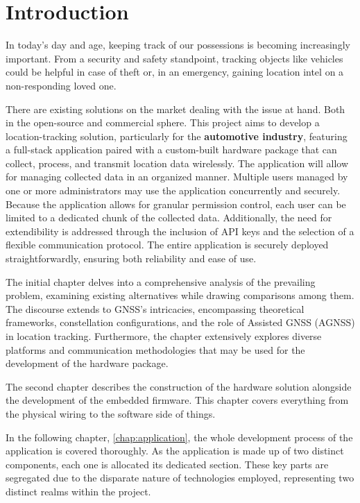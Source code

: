 \documentclass[FM,BP,EN,fonts]{tulthesis}
\begin{document}
\chapter*{Introduction}
In today’s day and age, keeping track of our possessions is becoming increasingly important. From a security and safety standpoint, tracking objects like vehicles could be helpful in case of theft or, in an emergency, gaining location intel on a non-responding loved one. 

There are existing solutions on the market dealing with the issue at hand. Both in the open-source and commercial sphere. This project aims to develop a location-tracking solution, particularly for the \textbf{automotive industry}, featuring a full-stack application paired with a custom-built hardware package that can collect, process, and transmit location data wirelessly. The application will allow for managing collected data in an organized manner. Multiple users managed by one or more administrators may use the application concurrently and securely. Because the application allows for granular permission control, each user can be limited to a dedicated chunk of the collected data. Additionally, the need for extendibility is addressed through the inclusion of API keys and the selection of a flexible communication protocol. The entire application is securely deployed straightforwardly, ensuring both reliability and ease of use.

The initial chapter delves into a comprehensive analysis of the prevailing problem, examining existing alternatives while drawing comparisons among them. The discourse extends to GNSS's intricacies, encompassing theoretical frameworks, constellation configurations, and the role of Assisted GNSS (AGNSS) in location tracking. Furthermore, the chapter extensively explores diverse platforms and communication methodologies that may be used for the development of the hardware package.

The second chapter describes the construction of the hardware solution alongside the development of the embedded firmware. This chapter covers everything from the physical wiring to the software side of things.

In the following chapter, \autoref{chap:application}, the whole development process of the application is covered thoroughly. As the application is made up of two distinct components, each one is allocated its dedicated section. These key parts are segregated due to the disparate nature of technologies employed, representing two distinct realms within the project.
\end{document}
